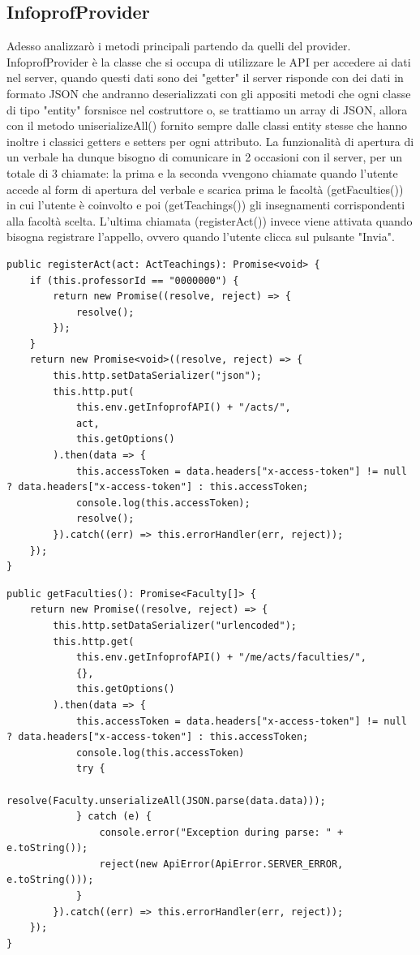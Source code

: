 \documentclass[Lau, oneside]{sapthesis}%
\begin{document}
\subsection{InfoprofProvider}
Adesso analizzarò i metodi principali partendo da quelli del provider. InfoprofProvider è la classe che si occupa di utilizzare le API per accedere ai dati nel server, quando questi dati sono dei "getter" il server risponde con dei dati in formato JSON che andranno deserializzati con gli appositi metodi che ogni classe di tipo "entity" forsnisce nel costruttore o, se trattiamo un array di JSON, allora con il metodo uniserializeAll() fornito sempre dalle classi entity stesse che hanno inoltre i classici getters e setters per ogni attributo. La funzionalità di apertura di un verbale ha dunque bisogno di comunicare in 2 occasioni con il server, per un totale di 3 chiamate: la prima e la seconda vvengono chiamate quando l'utente accede al form di apertura del verbale e scarica prima le facoltà (getFaculties()) in cui l'utente è coinvolto e poi (getTeachings()) gli insegnamenti corrispondenti alla facoltà scelta. L'ultima chiamata (registerAct()) invece viene attivata quando bisogna registrare l'appello, ovvero quando l'utente clicca sul pulsante "Invia".

\begin{lstlisting}
public registerAct(act: ActTeachings): Promise<void> {
	if (this.professorId == "0000000") {
		return new Promise((resolve, reject) => {
			resolve();
		});
	}
	return new Promise<void>((resolve, reject) => {
		this.http.setDataSerializer("json");
		this.http.put(
			this.env.getInfoprofAPI() + "/acts/",
			act,
			this.getOptions()
		).then(data => {
			this.accessToken = data.headers["x-access-token"] != null ? data.headers["x-access-token"] : this.accessToken;
			console.log(this.accessToken);
			resolve();
		}).catch((err) => this.errorHandler(err, reject));
	});
}
\end{lstlisting}

\begin{lstlisting}
public getFaculties(): Promise<Faculty[]> {
	return new Promise((resolve, reject) => {
		this.http.setDataSerializer("urlencoded");
		this.http.get(
			this.env.getInfoprofAPI() + "/me/acts/faculties/",
			{},
			this.getOptions()
		).then(data => {
			this.accessToken = data.headers["x-access-token"] != null ? data.headers["x-access-token"] : this.accessToken;
			console.log(this.accessToken)
			try {
				resolve(Faculty.unserializeAll(JSON.parse(data.data)));
			} catch (e) {
				console.error("Exception during parse: " + e.toString());
				reject(new ApiError(ApiError.SERVER_ERROR, e.toString()));
			}
		}).catch((err) => this.errorHandler(err, reject));
	});
}
\end{lstlisting}
\end{document}
